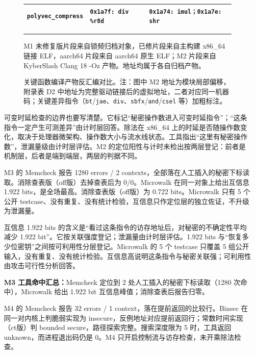 \begin{figure}[H]
\begin{minipage}{0.96\textwidth}
{\begin{tabularx}{\textwidth}{|>{\raggedright\arraybackslash}p{2.35cm}|>{\raggedright\arraybackslash}X|>{\raggedright\arraybackslash}X|}
\hline
\texttt{polyvec\_compress} & \texttt{0x1a7f: \textbf{div} \%r8d} & \texttt{0x1a74: \textbf{imul}；0x1a7e: \textbf{shr}} \\
\hline
\end{tabularx}
}
\vspace{0.4em}
\hrule
\end{minipage}
\caption{关键函数编译产物反汇编对比。注：图中 M2 地址为模块局部偏移，附录表 D2 中地址为完整驱动链接后的虚拟地址，二者对应同一机器码；关键差异指令（\texttt{bt}/\texttt{jae}、\texttt{div}、\texttt{sbfx}/\texttt{and}/\texttt{csel} 等）加粗标注。}
\label{fig:disasm}
\par\smallskip
{\footnotesize M1 未修复版片段来自锁频归档对象，已修片段来自主构建 x86\_64 链接 ELF，aarch64 片段来自 aarch64 原生 ELF；M2 片段来自 KyberSlash Clang 18 -Oz 产物。地址均属于各自归档产物。}
\end{figure}

可变时延检查的边界也要写清楚。它标记“秘密操作数进入可变时延指令”；“这条指令一定产生可测差异”由计时层回答。除法在 x86\_64 上的时延是否随操作数变化，取决于处理器微架构、操作数大小与流水线状态。工具指出“这里有秘密操作数”，泄漏量级由计时层评估。M2 的定位阳性与计时未检出按两层登记：前者是机制层，后者是端到端层，两层的判据不同。

M3 的 Memcheck 报告 1280 errors / 2 contexts，全部落在人工插入的秘密下标读取。消除查表版（off版）去掉查表后为 0/0。Microwalk 在同一对象上给出互信息 1.922 bits，是全场最高。消除查表版（off版）为 0.722 bits。Microwalk 只有 5 个公开 testcase、没有重复、没有统计检验，互信息只作定位层的独立佐证，不升级为泄漏量。\cite{microwalk} %

互信息 1.922 bits 的含义是“看过这条指令的访存地址后，对秘密的不确定性平均减少 1.922 bit”。它按关联强度登记；泄漏量由计时层评估。1.922 bits 与“恢复多少位密钥”之间按可利用性分层登记。Microwalk 的 5 个 testcase 只覆盖 5 组公开输入，没有重复、没有统计检验。互信息高说明这条指令与秘密关联强；可利用性由攻击可行性分析回答。

\par\smallskip\noindent\textbf{M3 工具命中汇总：}Memcheck 定位到 2 处人工插入的秘密下标读取（1280 次命中），Microwalk 给出 1.922 bit 互信息峰值；消除查表后报告归零。

M4 的 Memcheck 报告 32 errors / 1 context，落在提前返回的比较行。Binsec 在同一对内核上判脆弱实现为 insecure，反例地址对应提前返回行；常数时间实现（ct版）判 bounded secure，路径探索完整。搜索深度限为 5 时，工具返回 unknown，而进程退出码仍是 0。M4 只开启控制流与访存检查，未开乘除法检查。\cite{binsec} %

